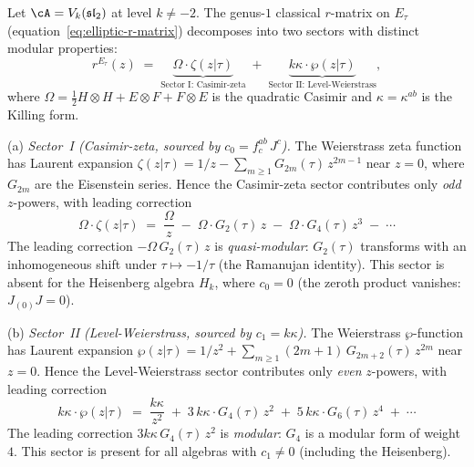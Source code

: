 \begin{theorem}
\label{thm:genus-1-two-sector}
Let\/ $\cA = V_k(\mathfrak{sl}_2)$ at level
$k \ne -2$. The genus-$1$ classical $r$-matrix on
$E_\tau$
\textup{(}equation~\eqref{eq:elliptic-r-matrix}\textup{)}
decomposes into two sectors with distinct modular
properties:
\begin{equation}\label{eq:sl2-genus1-two-sector}
 r^{E_\tau}(z)
 \;=\;
 \underbrace{\Omega \cdot \zeta(z|\tau)}_{\text{Sector I:
 Casimir-zeta}}
 \;+\;
 \underbrace{k\kappa \cdot \wp(z|\tau)}_{\text{Sector II:
 Level-Weierstrass}},
\end{equation}
where $\Omega = \tfrac{1}{2}H \otimes H + E \otimes F
+ F \otimes E$ is the quadratic Casimir and
$\kappa = \kappa^{ab}$ is the Killing form.

\medskip
\noindent\textup{(a)} \emph{Sector~I \textup{(}Casimir-zeta,
sourced by $c_0 = f^{ab}_c\,J^c$\textup{)}.}
The Weierstrass zeta function has Laurent expansion
$\zeta(z|\tau) = 1/z - \sum_{m \ge 1} G_{2m}(\tau)\,z^{2m-1}$
near $z = 0$, where $G_{2m}$ are the Eisenstein series.
Hence the Casimir-zeta sector contributes only \emph{odd}
$z$-powers, with leading correction
\begin{equation}\label{eq:sector-I-leading}
 \Omega \cdot \zeta(z|\tau)
 \;=\;
 \frac{\Omega}{z}
 \;-\; \Omega \cdot G_2(\tau)\,z
 \;-\; \Omega \cdot G_4(\tau)\,z^3
 \;-\; \cdots
\end{equation}
The leading correction $-\Omega\,G_2(\tau)\,z$ is
\emph{quasi-modular}: $G_2(\tau)$ transforms with an
inhomogeneous shift under $\tau \mapsto -1/\tau$
\textup{(}the Ramanujan identity\textup{)}.
This sector is absent for the Heisenberg algebra $H_k$,
where $c_0 = 0$ (the zeroth product vanishes: $J_{(0)}J = 0$).

\medskip
\noindent\textup{(b)} \emph{Sector~II
\textup{(}Level-Weierstrass, sourced by
$c_1 = k\kappa$\textup{)}.}
The Weierstrass $\wp$-function has Laurent expansion
$\wp(z|\tau) = 1/z^2 + \sum_{m \ge 1}(2m+1)\,G_{2m+2}(\tau)\,
z^{2m}$ near $z = 0$.
Hence the Level-Weierstrass sector contributes only \emph{even}
$z$-powers, with leading correction
\begin{equation}\label{eq:sector-II-leading}
 k\kappa \cdot \wp(z|\tau)
 \;=\;
 \frac{k\kappa}{z^2}
 \;+\; 3\,k\kappa \cdot G_4(\tau)\,z^2
 \;+\; 5\,k\kappa \cdot G_6(\tau)\,z^4
 \;+\; \cdots
\end{equation}
The leading correction $3k\kappa\,G_4(\tau)\,z^2$ is
\emph{modular}: $G_4$ is a modular form of weight~$4$.
This sector is present for all algebras with
$c_1 \ne 0$ \textup{(}including the Heisenberg\textup{)}.


\end{theorem}
